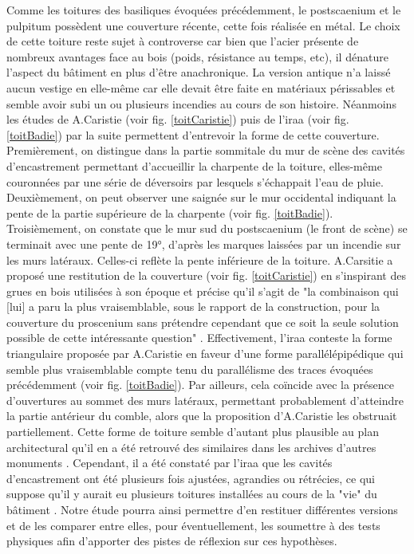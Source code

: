 		Comme les toitures des \glspl{basilique} évoquées précédemment, le \gls{postscaenium} et le \gls{pulpitum} possèdent une couverture récente, cette fois réalisée en métal. Le choix de cette toiture reste sujet à controverse car bien que l'acier présente de nombreux avantages face au bois (poids, résistance au temps, etc), il dénature l'aspect du bâtiment en plus d'être anachronique. La version antique n'a laissé aucun vestige en elle-même car elle devait être faite en matériaux périssables et semble avoir subi un ou plusieurs incendies au cours de son histoire. Néanmoins les études de A.Caristie (voir fig. \ref{toitCaristie}) puis de l'\gls{iraa} (voir fig. \ref{toitBadie}) par la suite permettent d'entrevoir la forme de cette couverture. Premièrement, on distingue dans la partie sommitale du mur de scène des cavités d'encastrement permettant d'accueillir la charpente de la toiture, elles-même couronnées par une série de déversoirs par lesquels s’échappait l’eau de pluie. Deuxièmement, on peut observer une saignée sur le mur occidental indiquant la pente de la partie supérieure de la charpente (voir fig. \ref{toitBadie}). Troisièmement, on constate que le mur sud du \gls{postscaenium} (le front de scène) se terminait avec une pente de 19°, d'après les marques laissées par un incendie sur les murs latéraux. Celles-ci reflète la pente inférieure de la toiture. A.Carsitie a proposé une restitution de la couverture (voir fig. \ref{toitCaristie}) en s'inspirant des grues en bois utilisées à son époque et précise qu'il s'agit de "la combinaison qui [lui] a paru la plus vraisemblable, sous le rapport de la construction, pour la couverture du proscenium sans prétendre cependant que ce soit la seule solution possible de cette intéressante question" \cite[p. 31]{orangeTxt}. Effectivement, l'\gls{iraa} \cite[p. 32]{orangeTxt} conteste la forme triangulaire proposée par A.Caristie en faveur d'une forme parallélépipédique qui semble plus vraisemblable compte tenu du parallélisme des traces évoquées précédemment (voir fig. \ref{toitBadie}). Par ailleurs, cela coïncide avec la présence d'ouvertures au sommet des murs latéraux, permettant probablement d'atteindre la partie antérieur du comble, alors que la proposition d'A.Caristie les obstruait partiellement. Cette forme de toiture semble d'autant plus plausible au plan architectural qu'il en a été retrouvé des similaires dans les archives d'autres monuments \cite[fig. 27]{orangeTxt}. Cependant, il a été constaté par l'\gls{iraa} que les cavités d'encastrement ont été plusieurs fois ajustées, agrandies ou rétrécies, ce qui suppose qu'il y aurait eu plusieurs toitures installées au cours de la "vie" du bâtiment \cite[p. 33]{orangeTxt}. Notre étude pourra ainsi permettre d'en restituer différentes versions et de les comparer entre elles, pour éventuellement, les soumettre à des tests physiques afin d'apporter des pistes de réflexion sur ces hypothèses.
		
